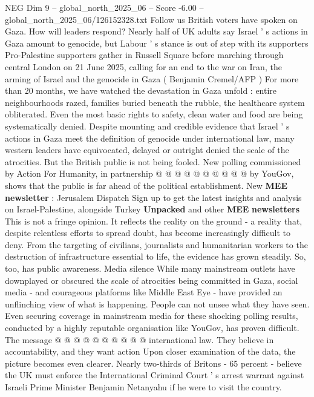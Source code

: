 \begin{textsample}{NEG Dim 9 – global\_north\_2025\_06 – Score -6.00 – global\_north\_2025\_06/126152328.txt}  \label{ex:f9_neg_083}
Follow us British voters have spoken on Gaza.
How will leaders respond?
Nearly half of UK adults say Israel ' s actions in Gaza amount to genocide, but Labour ' s stance is out of step with its supporters Pro-Palestine supporters gather in Russell Square before marching through central London on 21 June 2025, calling for an end to the war on Iran, the arming of Israel and the genocide in Gaza ( Benjamin Cremel/AFP ) For more than 20 months, we have watched the devastation in Gaza unfold : entire neighbourhoods razed, families buried beneath the rubble, the healthcare system obliterated.
Even the most basic rights to safety, clean water and food are being systematically denied.
Despite mounting and credible evidence that Israel ' s actions in Gaza meet the definition of genocide under international law, many western leaders have equivocated, delayed or outright denied the scale of the atrocities.
But the British public is not being fooled.
New polling commissioned by Action For Humanity, in partnership @ @ @ @ @ @ @ @ @ @ by YouGov, shows that the public is far ahead of the political establishment.
New \textbf{MEE} \textbf{newsletter} : Jerusalem Dispatch Sign up to get the latest insights and analysis on Israel-Palestine, alongside Turkey \textbf{Unpacked} and other \textbf{MEE} \textbf{newsletters} This is not a fringe opinion.
It reflects the reality on the ground - a reality that, despite relentless efforts to spread doubt, has become increasingly difficult to deny.
From the targeting of civilians, journalists and humanitarian workers to the destruction of infrastructure essential to life, the evidence has grown steadily.
So, too, has public awareness.
Media silence While many mainstream outlets have downplayed or obscured the scale of atrocities being committed in Gaza, social media - and courageous platforms like Middle East Eye - have provided an unflinching view of what is happening.
People can not unsee what they have seen.
Even securing coverage in mainstream media for these shocking polling results, conducted by a highly reputable organisation like YouGov, has proven difficult.
The message @ @ @ @ @ @ @ @ @ @ international law.
They believe in accountability, and they want action Upon closer examination of the data, the picture becomes even clearer.
Nearly two-thirds of Britons - 65 percent - believe the UK must enforce the International Criminal Court ' s arrest warrant against Israeli Prime Minister Benjamin Netanyahu if he were to visit the country.

\end{textsample}
